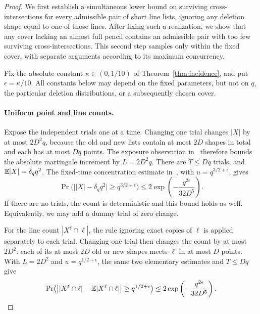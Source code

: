\begin{proof}
We first establish a simultaneous lower bound on surviving
cross-intersections for every admissible pair of short line lists,
ignoring any deletion shape equal to one of those lines. After fixing
such a realization, we show that any cover lacking an almost full
pencil contains an admissible pair with too few surviving
cross-intersections. This second step samples only within the fixed
cover, with separate arguments according to its maximum concurrency.

Fix the absolute constant $\kappa\in(0,1/10)$ of
Theorem~\ref{thm:incidence}, and put $\epsilon=\kappa/10$.
All constants below may depend on the fixed parameters, but not on
$q$, the particular deletion distributions, or a subsequently chosen
cover.

\paragraph{Uniform point and line counts.}
Expose the independent trials one at a time. Changing one trial
changes $|X|$ by at most $2D^2q$, because the old and new lists contain
at most $2D$ shapes in total and each has at most $Dq$ points.
The exposure observation in~\cite[Lemma~A.3]{OpenAI2026Balanced}
therefore bounds the absolute martingale increment by $L=2D^2q$.
There are $T\le Dq$ trials, and $\mathbb E|X|=\delta_q q^2$. The fixed-time
concentration estimate in~\cite[Lemma~A.2]{OpenAI2026Balanced}, with
$u=q^{3/2+\epsilon}$, gives
\[
 \Pr\bigl(\bigl||X|-\delta_q q^2\bigr|\ge q^{3/2+\epsilon}\bigr)
 \le2\exp\left(-\frac{q^{2\epsilon}}{32D^5}\right).
\]
If there are no trials, the count is deterministic and this bound
holds as well. Equivalently, we may add a dummy trial of zero change.

For the line count $|X^\ell\cap\ell|$, the rule ignoring exact copies
of $\ell$ is applied separately to each trial. Changing one trial
then changes the count by at most $2D^2$: each of its at most $2D$
old or new shapes meets $\ell$ in at most $D$ points. With
$L=2D^2$ and $u=q^{1/2+\epsilon}$, the same two elementary estimates
and $T\le Dq$ give
\[
 \Pr\bigl(\bigl||X^\ell\cap\ell|-\mathbb E|X^\ell\cap\ell|\bigr|
              \ge q^{1/2+\epsilon}\bigr)
 \le2\exp\left(-\frac{q^{2\epsilon}}{32D^5}\right).
\]


\end{proof}
